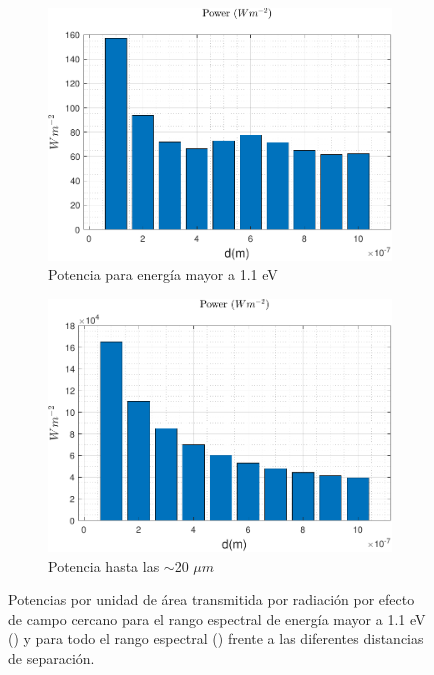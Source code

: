 \begin{figure}[H]
	\centering
		\begin{subfigure}[b]{0.49\textwidth}
	\centering
		\includegraphics[width=1.00\textwidth]{figuras/Resultados/radiacion/p_11_SiSi.pdf}
	\caption{Potencia para energía mayor a 1.1 eV}
	\label{fig:prad_Eg11_SiSi}
\end{subfigure}
\hfill
\begin{subfigure}[b]{0.49\textwidth}
	\centering
		\includegraphics[width=1.00\textwidth]{figuras/Resultados/radiacion/p_full_SiSi.pdf}
	\caption{Potencia hasta las $\sim$20 $\mu m$}
	\label{fig:prad_full_SiSi}
\end{subfigure}
	\caption{Potencias por unidad de área transmitida por radiación por efecto de campo cercano para el rango espectral de energía mayor a 1.1 eV () y para todo el rango espectral () frente a las diferentes distancias de separación.}
	\label{fig:prad_SiSi}
\end{figure}
